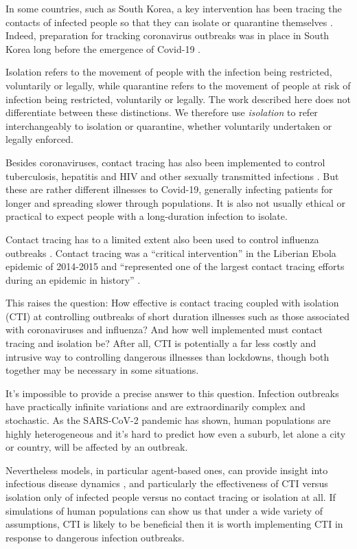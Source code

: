 \documentclass{article}
\begin{document}
In some countries, such as South Korea, a key intervention has been tracing the
contacts of infected people so that they can isolate or quarantine themselves
\cite{Jung2020,Lee2020}. Indeed, preparation for tracking coronavirus outbreaks
was in place in South Korea long before the emergence of Covid-19
\cite{Park2016}.

Isolation refers to the movement of people with the infection being restricted,
voluntarily or legally, while quarantine refers to the movement of people at
risk of infection being restricted, voluntarily or legally. The work described
here does not differentiate between these distinctions. We therefore use
\emph{isolation} to refer interchangeably to isolation or quarantine, whether
voluntarily undertaken or legally enforced.

Besides coronaviruses, contact tracing has also been implemented to control
tuberculosis, hepatitis and HIV and other sexually transmitted infections
\cite{Dennis2018,MacPherson2019,Katzman2019,Stokes1999}. But these are rather
different illnesses to Covid-19, generally infecting patients for longer and
spreading slower through populations. It is also not usually ethical or
practical to expect people with a long-duration infection to isolate.

Contact tracing has to a limited extent also been used to control influenza
outbreaks \cite{Swaan2011,Eames2010}. Contact tracing was a ``critical
intervention'' in the Liberian Ebola epidemic of 2014-2015 and ``represented one
of the largest contact tracing efforts during an epidemic in history'' \cite{Swanson2018}.

This raises the question: How effective is contact tracing coupled with
isolation (CTI) at controlling outbreaks of short duration illnesses such as
those associated with coronaviruses and influenza? And how well
implemented must contact tracing and isolation be? After all, CTI is potentially
a far less costly and intrusive way to controlling dangerous illnesses than
lockdowns, though both together may be necessary in some situations.

It's impossible to provide a precise answer to this question. Infection
outbreaks have practically infinite variations and are extraordinarily complex
and stochastic. As the SARS-CoV-2 pandemic has shown, human populations are
highly heterogeneous and it's hard to predict how even a suburb, let alone a
city or country, will be affected by an outbreak.

Nevertheless models, in particular agent-based ones, can provide insight into
infectious disease dynamics \cite{Geffen2018,Hunter2019}, and particularly the
effectiveness of CTI versus isolation only of infected people versus no contact
tracing or isolation at all. If simulations of human populations can show us
that under a wide variety of assumptions, CTI is likely to be beneficial then it
is worth implementing CTI in response to dangerous infection outbreaks.
\end{document}
